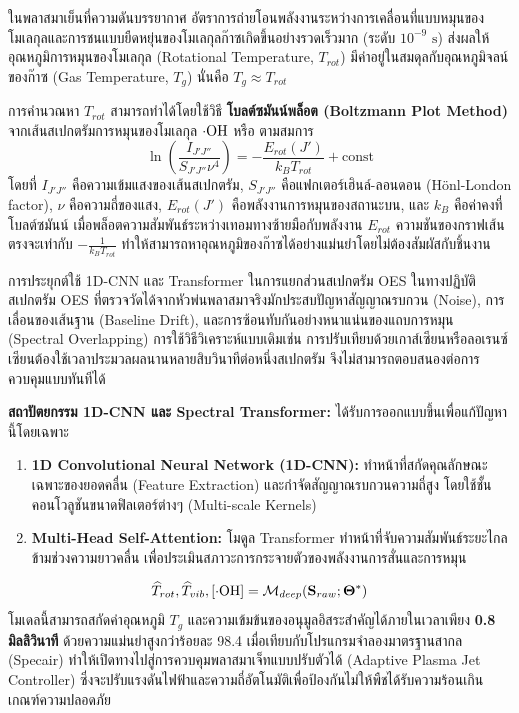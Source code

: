 ในพลาสมาเย็นที่ความดันบรรยากาศ อัตราการถ่ายโอนพลังงานระหว่างการเคลื่อนที่แบบหมุนของโมเลกุลและการชนแบบยืดหยุ่นของโมเลกุลก๊าซเกิดขึ้นอย่างรวดเร็วมาก (ระดับ $10^{-9}\text{ s}$) ส่งผลให้อุณหภูมิการหมุนของโมเลกุล (Rotational Temperature, $T_{rot}$) มีค่าอยู่ในสมดุลกับอุณหภูมิจลน์ของก๊าซ (Gas Temperature, $T_g$) นั่นคือ $T_g \approx T_{rot}$

การคำนวณหา $T_{rot}$ สามารถทำได้โดยใช้วิธี \textbf{โบลต์ซมันน์พล็อต (Boltzmann Plot Method)} จากเส้นสเปกตรัมการหมุนของโมเลกุล $\cdot\ce{OH}$ หรือ  ตามสมการ
\begin{equation}
    \ln\left( \frac{I_{J'J''}}{S_{J'J''} \nu^4} \right) = -\frac{E_{rot}(J')}{k_B T_{rot}} + \text{const}
    \label{eq:boltzmann_plot}
\end{equation}
โดยที่ $I_{J'J''}$ คือความเข้มแสงของเส้นสเปกตรัม, $S_{J'J''}$ คือแฟกเตอร์เฮินล์-ลอนดอน (Hönl-London factor), $\nu$ คือความถี่ของแสง, $E_{rot}(J')$ คือพลังงานการหมุนของสถานะบน, และ $k_B$ คือค่าคงที่โบลต์ซมันน์ เมื่อพล็อตความสัมพันธ์ระหว่างเทอมทางซ้ายมือกับพลังงาน $E_{rot}$ ความชันของกราฟเส้นตรงจะเท่ากับ $-\frac{1}{k_B T_{rot}}$ ทำให้สามารถหาอุณหภูมิของก๊าซได้อย่างแม่นยำโดยไม่ต้องสัมผัสกับชิ้นงาน

\begin{aibox}{การประยุกต์ใช้ 1D-CNN และ Transformer ในการแยกส่วนสเปกตรัม OES}
ในทางปฏิบัติ สเปกตรัม OES ที่ตรวจวัดได้จากหัวพ่นพลาสมาจริงมักประสบปัญหาสัญญาณรบกวน (Noise), การเลื่อนของเส้นฐาน (Baseline Drift), และการซ้อนทับกันอย่างหนาแน่นของแถบการหมุน (Spectral Overlapping) การใช้วิธีวิเคราะห์แบบเดิมเช่น การปรับเทียบด้วยเกาส์เซียนหรือลอเรนซ์เซียนต้องใช้เวลาประมวลผลนานหลายสิบวินาทีต่อหนึ่งสเปกตรัม จึงไม่สามารถตอบสนองต่อการควบคุมแบบทันทีได้

\textbf{สถาปัตยกรรม 1D-CNN และ Spectral Transformer:} ได้รับการออกแบบขึ้นเพื่อแก้ปัญหานี้โดยเฉพาะ
\begin{enumerate}
    \item \textbf{1D Convolutional Neural Network (1D-CNN):} ทำหน้าที่สกัดคุณลักษณะเฉพาะของยอดคลื่น (Feature Extraction) และกำจัดสัญญาณรบกวนความถี่สูง โดยใช้ชั้นคอนโวลูชันขนาดฟิลเตอร์ต่างๆ (Multi-scale Kernels)
    \item \textbf{Multi-Head Self-Attention:} โมดูล Transformer ทำหน้าที่จับความสัมพันธ์ระยะไกลข้ามช่วงความยาวคลื่น เพื่อประเมินสภาวะการกระจายตัวของพลังงานการสั่นและการหมุน
\end{enumerate}
\begin{equation}
    \widehat{T}_{rot}, \widehat{T}_{vib}, [\cdot\ce{OH}] = \mathcal{M}_{deep}(\mathbf{S}_{raw}; \mathbf{\Theta}^*)
\end{equation}
โมเดลนี้สามารถสกัดค่าอุณหภูมิ $T_g$ และความเข้มข้นของอนุมูลอิสระสำคัญได้ภายในเวลาเพียง \textbf{0.8 มิลลิวินาที} ด้วยความแม่นยำสูงกว่าร้อยละ 98.4 เมื่อเทียบกับโปรแกรมจำลองมาตรฐานสากล (Specair) ทำให้เปิดทางไปสู่การควบคุมพลาสมาเจ็ทแบบปรับตัวได้ (Adaptive Plasma Jet Controller) ซึ่งจะปรับแรงดันไฟฟ้าและความถี่อัตโนมัติเพื่อป้องกันไม่ให้พืชได้รับความร้อนเกินเกณฑ์ความปลอดภัย
\end{aibox}

